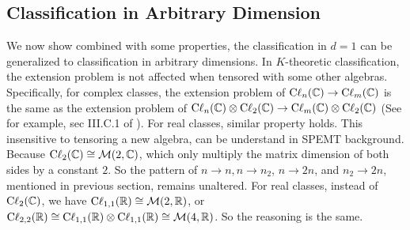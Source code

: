 \subsection{Classification in Arbitrary Dimension}
\label{sec:Classification in Arbitrary Dimension}
We now show combined with some properties, the classification in $d=1$ can be
generalized to classification in arbitrary dimensions. In $K$-theoretic
classification, the extension problem is not affected when tensored with some
other algebras. Specifically, for complex classes, the extension problem of
$\mathrm{C\ell}_{n}(\mathbb{C})\to\mathrm{C\ell}_{m}(\mathbb{C})$ is the same as the extension
problem of $\mathrm{C\ell}_{n}(\mathbb{C})\otimes\mathrm{C\ell}_{2}(\mathbb{C})\to
\mathrm{C\ell}_{m}(\mathbb{C})\otimes\mathrm{C\ell}_{2}(\mathbb{C})$ (See for example, sec
III.C.1 of \cite{Chiu2016}). For real classes, similar property holds.
This insensitive to tensoring a new algebra, can be understand in SPEMT
background. Because $\mathrm{C\ell}_{2}(\mathbb{C})\cong\mathcal{M}(2,\mathbb{C})$, which only
multiply the matrix dimension of both sides by a constant $2$. So the pattern of
$n\to n, n\to n_2$, $n\to 2n$, and $n_2\to 2n$, mentioned in previous section,
remains unaltered. For real classes, instead of $\mathrm{C\ell}_{2}(\mathbb{C})$, we
have $\mathrm{C\ell}_{1,1}(\mathbb{R})\cong\mathcal{M}(2,\mathbb{R})$, or
$\mathrm{C\ell}_{2,2}(\mathbb{R})\cong\mathrm{C\ell}_{1,1}(\mathbb{R})\otimes\mathrm{C\ell}_{1,1}(\mathbb{R})\cong\mathcal{M}(4,\mathbb{R})$.
So the reasoning is the same.

